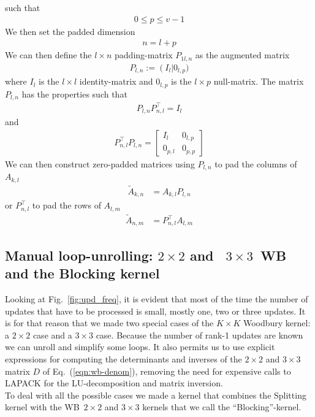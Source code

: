 \documentclass[11pt]{article}
\numberwithin{figure}{section}
\numberwithin{table}{section}
\begin{document}
such that
\begin{align}
	0 \leq p \leq v-1
\end{align}
We then set the padded dimension
\begin{align}
n = l + p
\end{align}
We can then define the $l\times n$ padding-matrix $P_{1l,n}$ as the augmented matrix
\begin{align}
	P_{l,n} := \left(I_l\right|0_{l,p})
\end{align}
where $I_l$ is the $l\times l$ identity-matrix and $0_{l,p}$ is the $l\times p$ null-matrix.
The matrix $P_{l,n}$ has the properties such that
\begin{align}
	P_{l,n}P^\top _{n,l}=I_l
\end{align}
and
\begin{align}
	P^\top _{n,l}P_{l,n}=
	\begin{bmatrix}
			I_l & 0_{l,p} \\
			0_{p,l} & 0_{p,p}
\end{bmatrix}
\end{align}
We can then construct zero-padded matrices using $P_{l,n}$ to pad the columns of $A_{k,l}$
\begin{align}
	\widetilde{A}_{k,n} &= A_{k,l}P_{l,n}
\end{align}
or $P^\top_{n,l}$ to pad the rows of $A_{l,m}$
\begin{align}
	\widetilde{A}_{n,m} &= P^\top_{n,l}A_{l,m}
\end{align}


			\subsection{Manual loop-unrolling: $2\times 2$ and ~$3\times 3$~WB and the Blocking kernel}
				Looking at Fig.~\ref{fig:upd_freq}, it is evident that most of the time the number of updates that have to be processed is small, mostly one, two or three updates. It is for that reason that we made two special cases of the $K\times K$ Woodbury kernel: a $2\times 2$ case and a $3\times 3$ case. Because the number of rank-1 updates are known we can unroll and simplify some loops. It also permits us to use explicit expressions for computing the determinants and inverses of the $2\times 2$ and $3\times 3$ matrix $D$ of Eq.~(\ref{eqn:wb-denom}), removing the need for expensive calls to LAPACK for the LU-decomposition and matrix inversion.\\
				
				To deal with all the possible cases we made a kernel that combines the Splitting kernel with the WB~$2\times 2$ and $3\times 3$ kernels that we call the ``Blocking''-kernel.
				
\end{document}
